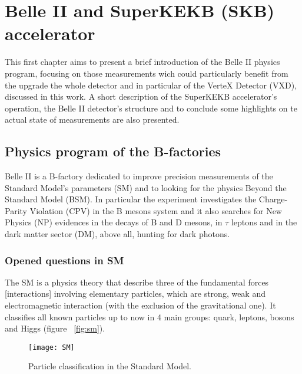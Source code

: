 
\chapter{Belle II and SuperKEKB (SKB) accelerator}

This first chapter aims to present a brief introduction of the Belle II physics program, focusing on those measurements wich could particularly benefit from the upgrade the whole detector and in particular of the VerteX Detector (VXD), discussed in this work. A short description of the SuperKEKB accelerator's operation, the Belle II detector's structure and to conclude some highlights on te actual state of measurements are also presented.



\section{Physics program of the B-factories}

Belle II is a B-factory dedicated to improve precision measurements of the Standard Model's parameters (SM) and to looking for the physics Beyond the Standard Model (BSM).
In particular the experiment investigates the Charge-Parity Violation (CPV) in the B mesons system and it also searches for New Physics (NP) evidences in the decays of B and D mesons, in $\tau$ leptons and in the dark matter sector (DM), above all, hunting for dark photons.



\subsection{Opened questions in SM}

The SM is a physics theory that describe three of the fundamental forces [interactions] involving elementary particles, which are strong, weak and electromagnetic interaction (with the exclusion of the gravitational one). It classifies all known particles up to now in 4 main groups: quark, leptons, bosons and Higgs (figure ~\vref{fig:sm}).


\begin{figure}[h]
\centering
\texttt{[image: SM]}
\caption{Particle classification in the Standard Model.}
\label{fig:sm}
\end{figure}


